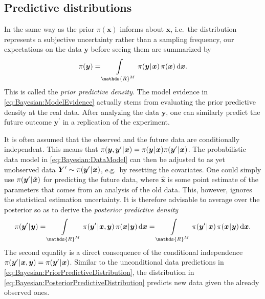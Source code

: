 \subsection{Predictive distributions}
In the same way as the prior \(\pi(\bm{x})\) informs about \(\bm{x}\), i.e.\ the distribution represents a subjective uncertainty rather than a sampling frequency,
our expectations on the data \(\bm{y}\) before seeing them are summarized by
\begin{equation} \label{eq:Bayesian:PriorPredictiveDistribution}
  \pi(\bm{y}) = \int\limits_{\mathds{R}^\dimParam} \pi(\bm{y} \cond \bm{x}) \, \pi(\bm{x}) \, \mathrm{d} \bm{x}.
\end{equation}
This is called the \emph{prior predictive density}.
The model evidence in \cref{eq:Bayesian:ModelEvidence} actually stems from evaluating the prior predictive density at the real data.
After analyzing the data \(\bm{y}\), one can similarly predict the future outcome \(\bm{y}^\prime\) in a replication of the experiment.
\par %
It is often assumed that the observed and the future data are conditionally independent.
This means that \(\pi(\bm{y},\bm{y}^\prime {\:\!}|{\:\!} \bm{x}) = \pi(\bm{y} {\:\!}|{\:\!} \bm{x}) \pi(\bm{y}^\prime {\:\!}|{\:\!} \bm{x})\).
The probabilistic data model in \cref{eq:Bayesian:DataModel} can then be adjusted to as yet unobserved data
\(\bm{Y}^\prime \sim \pi(\bm{y}^\prime {\:\!}|{\:\!} \bm{x})\), e.g.\ by resetting the covariates.
One could simply use \(\pi(\bm{y}^\prime {\:\!}|{\:\!} \hat{\bm{x}})\) for predicting the future data,
where \(\hat{\bm{x}}\) is some point estimate of the parameters that comes from an analysis of the old data.
This, however, ignores the statistical estimation uncertainty.
It is therefore advisable to average over the posterior so as to derive the \emph{posterior predictive density}
\begin{equation} \label{eq:Bayesian:PosteriorPredictiveDistribution}
  \pi(\bm{y}^\prime \cond \bm{y})
  = \int\limits_{\mathds{R}^\dimParam} \pi(\bm{y}^\prime \cond \bm{x},\bm{y}) \, \pi(\bm{x} \cond \bm{y}) \, \mathrm{d} \bm{x}
  = \int\limits_{\mathds{R}^\dimParam} \pi(\bm{y}^\prime \cond \bm{x}) \, \pi(\bm{x} \cond \bm{y}) \, \mathrm{d} \bm{x}.
\end{equation}
The second equality is a direct consequence of the conditional independence \(\pi(\bm{y}^\prime {\:\!}|{\:\!} \bm{x},\bm{y}) = \pi(\bm{y}^\prime {\:\!}|{\:\!} \bm{x})\).
Similar to the unconditional data predictions in \cref{eq:Bayesian:PriorPredictiveDistribution},
the distribution in \cref{eq:Bayesian:PosteriorPredictiveDistribution} predicts new data given the already observed ones.

